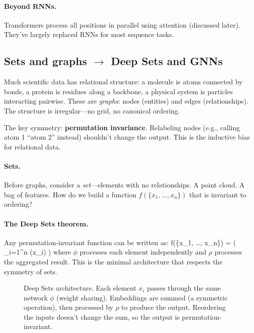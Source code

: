 \documentclass[11pt]{article}
\begin{document}
\paragraph{Beyond RNNs.} Transformers process all positions in parallel using attention (discussed later). They've largely replaced RNNs for most sequence tasks.

\subsection{Sets and graphs $\to$ Deep Sets and GNNs}

Much scientific data has relational structure: a molecule is atoms connected by bonds, a protein is residues along a backbone, a physical system is particles interacting pairwise. These are \emph{graphs}: nodes (entities) and edges (relationships). The structure is irregular---no grid, no canonical ordering.

The key symmetry: \textbf{permutation invariance}. Relabeling nodes (e.g., calling atom 1 ``atom 2'' instead) shouldn't change the output. This is the inductive bias for relational data.

\paragraph{Sets.} Before graphs, consider a \emph{set}---elements with no relationships. A point cloud. A bag of features. How do we build a function $f(\{x_1, \ldots, x_n\})$ that is invariant to ordering?

\paragraph{The Deep Sets theorem.} Any permutation-invariant function can be written as:
\beq
f(\{x_1, \ldots, x_n\}) = \rho\left( \sum_{i=1}^n \phi(x_i) \right)
\eeq
where $\phi$ processes each element independently and $\rho$ processes the aggregated result. This is the minimal architecture that respects the symmetry of sets.


\begin{figure}[h]
\centering

\caption{Deep Sets architecture. Each element $x_i$ passes through the same network $\phi$ (weight sharing). Embeddings are summed (a symmetric operation), then processed by $\rho$ to produce the output. Reordering the inputs doesn't change the sum, so the output is permutation-invariant.}
\label{fig:deep_sets}
\end{figure}
\end{document}

